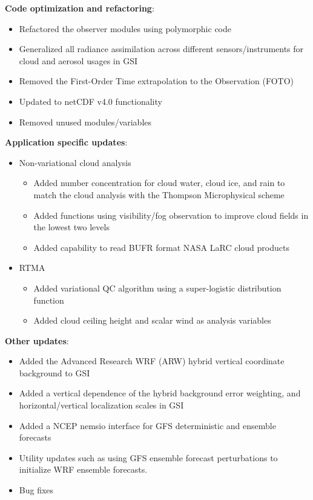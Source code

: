 \textbf{Code optimization and refactoring}:
\begin{itemize}
  \item Refactored the observer modules using polymorphic code
  \item Generalized all radiance assimilation across different sensors/instruments for cloud and aerosol usages in GSI 
  \item Removed the First-Order Time extrapolation to the Observation (FOTO)
  \item Updated to netCDF v4.0 functionality
  \item Removed unused modules/variables 
\end{itemize}

\textbf{Application specific updates}:
\begin{itemize}
 \item{Non-variational cloud analysis}
 \begin{itemize}
	\item Added number concentration for cloud water, cloud ice, and rain to match the cloud analysis with the Thompson Microphysical scheme
	\item Added functions using visibility/fog observation to improve cloud fields in the lowest two levels
	\item Added capability to read BUFR format NASA LaRC cloud products 
 \end{itemize}
 \item{RTMA}
 \begin{itemize}
	\item Added variational QC algorithm using a super-logistic distribution function
	\item Added cloud ceiling height and scalar wind as analysis variables 
 \end{itemize}
\end{itemize}

\textbf{Other updates}:
\begin{itemize}
  \item Added the Advanced Research WRF (ARW) hybrid vertical coordinate background to GSI
  \item Added a vertical dependence of the hybrid background error weighting, and horizontal/vertical localization scales in GSI
  \item Added a NCEP nemsio interface for GFS deterministic and ensemble forecasts
  \item Utility updates such as using GFS ensemble forecast perturbations to initialize WRF ensemble forecasts.
  \item Bug fixes
\end{itemize}

